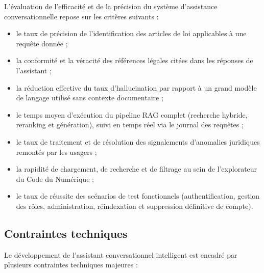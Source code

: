 L'évaluation de l'efficacité et de la précision du système d'assistance conversationnelle repose sur les critères suivants :

\begin{itemize}
    \item le taux de précision de l'identification des articles de loi applicables à une requête donnée ;
    
    \item la conformité et la véracité des références légales citées dans les réponses de l'assistant ;
    
    \item la réduction effective du taux d'hallucination par rapport à un grand modèle de langage utilisé sans contexte documentaire ;
    
    \item le temps moyen d'exécution du pipeline RAG complet (recherche hybride, reranking et génération), suivi en temps réel via le journal des requêtes ;
    
    \item le taux de traitement et de résolution des signalements d'anomalies juridiques remontés par les usagers ;
    
    \item la rapidité de chargement, de recherche et de filtrage au sein de l'explorateur du Code du Numérique ;
    
    \item le taux de réussite des scénarios de test fonctionnels (authentification, gestion des rôles, administration, réindexation et suppression définitive de compte).
\end{itemize}

\subsection{Contraintes techniques}

Le développement de l'assistant conversationnel intelligent est encadré par plusieurs contraintes techniques majeures :

